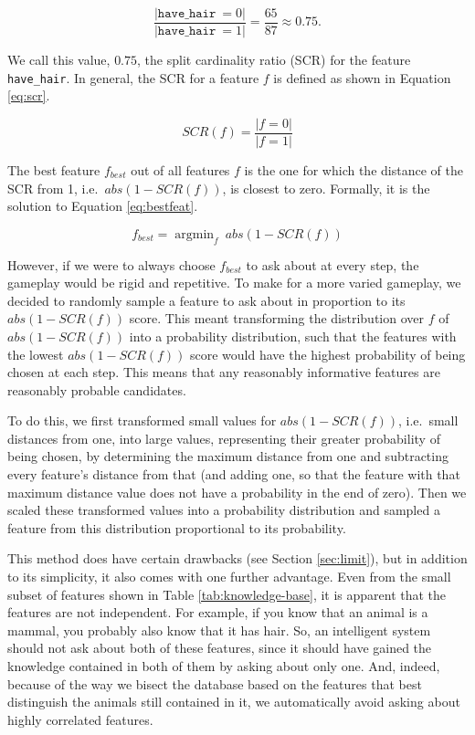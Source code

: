 \documentclass[11pt,a4paper]{article}
\DeclareMathOperator*{\argmin}{argmin}
\newcommand{\havehair}{\texttt{have\_hair}}
\begin{document}
{$$\frac{|\havehair\ = 0|}{|\havehair\ = 1|} = \frac{65}{87} \approx 0.75.$$

We call this value, $0.75$, the split cardinality ratio (SCR) for the feature \havehair.
In general, the SCR for a feature $f$ is defined as shown in Equation \ref{eq:scr}.

\begin{equation}
SCR(f) = \frac{|f = 0|}{|f = 1|} 
\label{eq:scr}
\end{equation}

The best feature $f_{best}$ out of all features $f$ is the one for which the distance of the SCR from 1, i.e.\ $abs(1 - SCR(f))$, is closest to zero.
Formally, it is the solution to Equation \ref{eq:bestfeat}.

\begin{equation}
f_{best} = \argmin_f\ abs(1 - SCR(f)) 
\label{eq:bestfeat}
\end{equation}

However, if we were to always choose $f_{best}$ to ask about at every step, the gameplay would be rigid and repetitive.
To make for a more varied gameplay, we decided to randomly sample a feature to ask about in proportion to its $abs(1 - SCR(f))$ score. 
This meant transforming the distribution over $f$ of $abs(1 - SCR(f))$ into a probability distribution, such that the features with the lowest $abs(1 - SCR(f))$ score would have the highest probability of being chosen at each step.
This means that any reasonably informative features are reasonably probable candidates.

To do this, we first transformed small values for $abs(1 - SCR(f))$, i.e.\ small distances from one, into large values, representing their greater probability of being chosen, by determining the maximum distance from one and subtracting every feature's distance from that (and adding one, so that the feature with that maximum distance value does not have a probability in the end of zero).
Then we scaled these transformed values into a probability distribution and sampled a feature from this distribution proportional to its probability.

This method does have certain drawbacks (see Section \ref{sec:limit}), but in addition to its simplicity, it also comes with one further advantage.
Even from the small subset of features shown in Table \ref{tab:knowledge-base}, it is apparent that the features are not independent.
For example, if you know that an animal is a mammal, you probably also know that it has hair.
So, an intelligent system should not ask about both of these features, since it should have gained the knowledge contained in both of them by asking about only one.
And, indeed, because of the way we bisect the database based on the features that best distinguish the animals still contained in it, we automatically avoid asking about highly correlated features.

}
\end{document}
